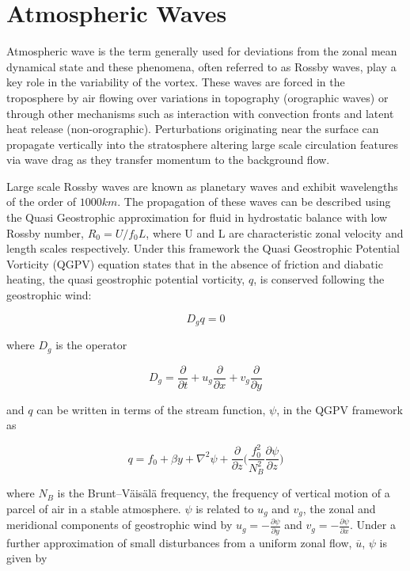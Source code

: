 \section{Atmospheric Waves}
\label{sec:atmos_waves}
Atmospheric wave is the term generally used for deviations from the zonal mean dynamical state and these phenomena, often referred to as Rossby waves, play a key role in the variability of the vortex. These waves are forced in the troposphere by air flowing over variations in topography (orographic waves) or through other mechanisms such as interaction with convection fronts and latent heat release (non-orographic). Perturbations originating near the surface can propagate vertically into the stratosphere altering large scale circulation features via wave drag as they transfer momentum to the background flow. 

Large scale Rossby waves are known as planetary waves and exhibit wavelengths of the order of $1000km$. The propagation of these waves can be described using the Quasi Geostrophic approximation for fluid in hydrostatic balance with low Rossby number, $R_0 = U/f_0 L$, where U and L are characteristic zonal velocity and length scales respectively. Under this framework the Quasi Geostrophic Potential Vorticity (QGPV) equation states that in the absence of friction and diabatic heating, the quasi geostrophic potential vorticity, $q$, is conserved following the geostrophic wind:

\begin{equation} \label{eq-PV_conserved}
D_g q = 0
\end{equation}

where $D_g$ is the operator 

\begin{equation}\label{eq:D_g}
D_g = \frac{\partial}{\partial t} + u_g \frac{\partial}{\partial x} + v_g\frac{\partial}{\partial y} 
\end{equation}

and $q$ can be written in terms of the stream function, $\psi$, in the QGPV framework as

\begin{equation} \label{eq:QGPV}
q = f_0 + \beta y + \nabla^2 \psi + \frac{\partial}{\partial z}\bigg(\frac{f_0^2}{N_B^2} \frac{\partial \psi}{\partial z}\bigg)
\end{equation}

where $N_B$ is the Brunt–Väisälä frequency, the frequency of vertical motion of a parcel of air in a stable atmosphere. $\psi$ is related to $u_g$ and $v_g$, the zonal and meridional components of geostrophic wind by $u_g = -\frac{\partial \psi}{\partial y}$ and $v_g = -\frac{\partial \psi}{\partial x}$. Under a further approximation of small disturbances from a uniform zonal flow, $\overline{u}$, $\psi$ is given by

